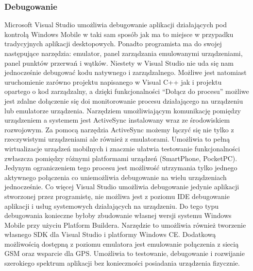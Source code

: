 \subsubsection{Debugowanie}
Microsoft Visual Studio umożliwia debugowanie aplikacji działających pod
kontrolą Windows Mobile w taki sam sposób jak ma to miejsce w przypadku
tradycyjnych aplikacji desktopowych. Ponadto programista ma do swojej
następujące narzędzia: emulator, panel zarządzania emulowanymi urządzeniami,
panel punktów przerwań i wątków. Niestety w Visual Studio nie uda się nam
jednocześnie debugować kodu natywnego i zarządzalnego. Możliwe jest natomiast
uruchomienie zarówno projektu napisanego w Visual C++ jak i projektu opartego o
kod zarządzalny, a dzięki funkcjonalności ``Dołącz do procesu'' możliwe jest
zdalne dołączenie się doi monitorowanie procesu działającego na urządzeniu lub
emulatorze urządzenia. Narzędziem umożliwiającym komunikację pomiędzy
urządzeniem a systemem jest ActiveSync instalowany wraz ze środowiskiem
rozwojowym.  Za pomocą narzędzia ActiveSync możemy łączyć się nie tylko z
rzeczywistymi urządzeniami ale również z emulatorami. Umożliwia to pełną
wirtualizacje urządzeń mobilnych i znacznie ułatwia testowanie funkcjonalności
zwłaszcza pomiędzy różnymi platformami urządzeń (SmartPhone, PocketPC). Jedynym
ograniczeniem tego procesu jest możliwość utrzymania tylko jednego aktywnego
połączenia co uniemożliwia debugowanie na wielu urządzeniach jednocześnie. Co
więcej Visual Studio umożliwia debugowanie jedynie aplikacji stworzonej przez
programistę, nie możliwa jest z poziomu IDE debugowanie aplikacji i usług
systemowych działających na urządzeniu. Do tego typu debugowania konieczne
byłoby zbudowanie własnej wersji systemu Windows Mobile przy użyciu Platform
Buildera. Narzędzie to umożliwia również tworzenie własnego SDK dla Visual
Studio i platformy Windows CE. Dodatkową możliwością dostępną z poziomu
emulatora jest emulowanie połączenia z siecią GSM oraz wsparcie dla GPS.
Umożliwia to testowanie, debugowanie i rozwijanie szerokiego spektrum aplikacji
bez konieczności posiadania urządzenia fizycznie. 

